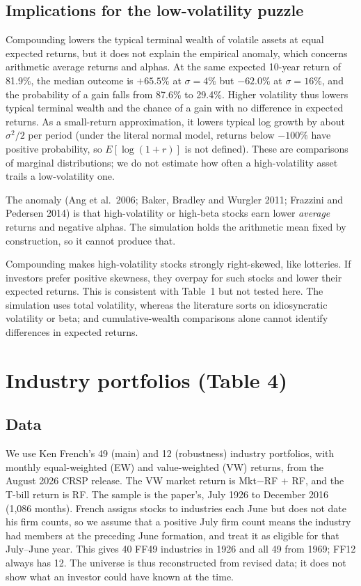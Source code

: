 \documentclass[11pt,letterpaper]{article}
\begin{document}
\subsection{Implications for the low-volatility puzzle}

Compounding lowers the typical terminal wealth of volatile assets at equal expected returns, but it does not explain
the empirical anomaly, which concerns arithmetic average returns and alphas.
At the same expected 10-year return of 81.9\%, the median outcome is
    $+65.5\%$ at $\sigma = 4\%$ but $-62.0\%$ at $\sigma = 16\%$, and the probability of a gain falls from 87.6\% to
    29.4\%. Higher volatility thus lowers typical terminal wealth and the chance of a gain with no difference in
    expected returns. As a small-return approximation, it lowers typical log growth by about $\sigma^2/2$ per period
    (under the literal normal model, returns below $-100\%$ have positive probability, so $E[\log(1+r)]$ is not
    defined). These are comparisons of marginal distributions; we do not estimate how often a high-volatility asset
    trails a low-volatility one.

The anomaly (Ang et al.\ 2006; Baker, Bradley and Wurgler 2011; Frazzini
    and Pedersen 2014) is that high-volatility or high-beta stocks earn lower \emph{average} returns and negative
    alphas. The simulation holds the arithmetic mean fixed by construction, so it cannot produce that.

Compounding makes high-volatility stocks strongly right-skewed, like lotteries.
    If investors prefer positive skewness, they overpay for such stocks and lower their expected returns. This is
    consistent with Table~1 but not tested here. The simulation uses total volatility,
    whereas the literature sorts on idiosyncratic volatility or beta; and cumulative-wealth comparisons alone cannot
    identify differences in expected returns.


\section{Industry portfolios (Table 4)}

\subsection{Data}

We use Ken French's 49 (main) and 12 (robustness) industry portfolios, with monthly equal-weighted (EW) and
value-weighted (VW) returns, from the August 2026 CRSP release. The VW market return is Mkt$-$RF $+$ RF, and the
T-bill return is RF. The sample is the paper's, July 1926 to December 2016 (1,086 months). French assigns stocks to
industries each June but does not date his firm counts, so we assume that a positive July firm count means the
industry had members at the preceding June formation, and treat it as eligible for that July--June year. This gives
40 FF49 industries in 1926 and all 49 from 1969; FF12 always has 12. The universe is thus reconstructed from revised
data; it does not show what an investor could have known at the time.
\end{document}
